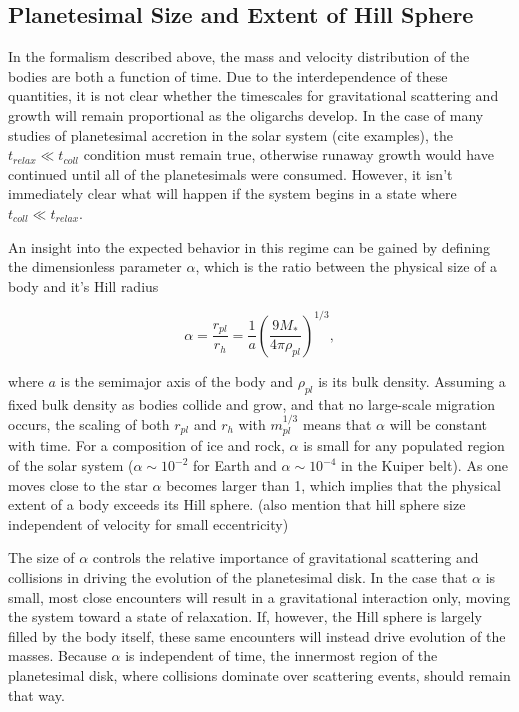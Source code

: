 \documentclass[twocolumn]{aastex63}
\begin{document}
\subsection{Planetesimal Size and Extent of Hill Sphere}\label{sec:sizeandhill}

In the formalism described above, the mass and velocity distribution of the bodies are both a function of time. Due to the interdependence of these quantities, it is not clear whether the timescales for gravitational scattering and growth will remain proportional as the oligarchs develop. In the case of many studies of planetesimal accretion in the solar system (cite examples), the $t_{relax} \ll t_{coll}$ condition must remain true, otherwise runaway growth would have continued until all of the planetesimals were consumed. However, it isn't immediately clear what will happen if the system begins in a state where $t_{coll} \ll t_{relax}$.

An insight into the expected behavior in this regime can be gained by defining the dimensionless parameter $\alpha$, which is the ratio between the physical size of a body and it's Hill radius

\begin{equation}\label{eq:alpha}
	\alpha = \frac{r_{pl}}{r_{h}} = \frac{1}{a} \left( \frac{9 M_{*}}{4 \pi \rho_{pl}} \right)^{1/3},
\end{equation}

\noindent where $a$ is the semimajor axis of the body and $\rho_{pl}$ is its bulk density. Assuming a fixed bulk density as bodies collide and grow, and that no large-scale migration occurs, the scaling of both $r_{pl}$ and $r_{h}$ with $m_{pl}^{1/3}$ means that $\alpha$ will be constant with time. For a composition of ice and rock, $\alpha$ is small for any populated region of the solar system ($\alpha \sim 10^{-2}$ for Earth and $\alpha \sim 10^{-4}$ in the Kuiper belt). As one moves close to the star $\alpha$ becomes larger than 1, which implies that the physical extent of a body exceeds its Hill sphere. (also mention that hill sphere size independent of velocity for small eccentricity)

The size of $\alpha$ controls the relative importance of gravitational scattering and collisions in driving the evolution of the planetesimal disk. In the case that $\alpha$ is small, most close encounters will result in a gravitational interaction only, moving the system toward a state of relaxation. If, however, the Hill sphere is largely filled by the body itself, these same encounters will instead drive evolution of the masses. Because $\alpha$ is independent of time, the innermost region of the planetesimal disk, where collisions dominate over scattering events, should remain that way.
\end{document}
